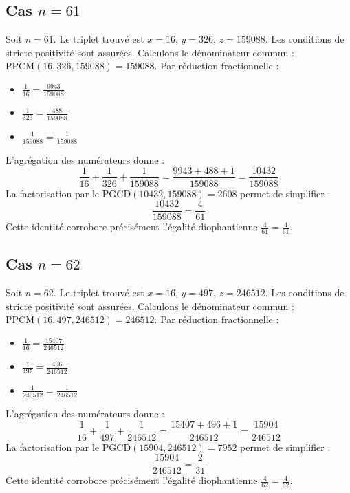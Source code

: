 \documentclass[11pt,a4paper]{article}
\begin{document}
\subsection{Cas $n = 61$}
Soit $n = 61$. Le triplet trouvé est $x = 16$, $y = 326$, $z = 159088$.
Les conditions de stricte positivité sont assurées.
Calculons le dénominateur commun : $\text{PPCM}(16, 326, 159088) = 159088$.
Par réduction fractionnelle :
\begin{itemize}
    \item $\frac{1}{16} = \frac{9943}{159088}$
    \item $\frac{1}{326} = \frac{488}{159088}$
    \item $\frac{1}{159088} = \frac{1}{159088}$
\end{itemize}
L'agrégation des numérateurs donne :
$$ \frac{1}{16} + \frac{1}{326} + \frac{1}{159088} = \frac{9943 + 488 + 1}{159088} = \frac{10432}{159088} $$
La factorisation par le $\text{PGCD}(10432, 159088) = 2608$ permet de simplifier :
$$ \frac{10432}{159088} = \frac{4}{61} $$
Cette identité corrobore précisément l'égalité diophantienne $\frac{4}{61} = \frac{4}{61}$.

\subsection{Cas $n = 62$}
Soit $n = 62$. Le triplet trouvé est $x = 16$, $y = 497$, $z = 246512$.
Les conditions de stricte positivité sont assurées.
Calculons le dénominateur commun : $\text{PPCM}(16, 497, 246512) = 246512$.
Par réduction fractionnelle :
\begin{itemize}
    \item $\frac{1}{16} = \frac{15407}{246512}$
    \item $\frac{1}{497} = \frac{496}{246512}$
    \item $\frac{1}{246512} = \frac{1}{246512}$
\end{itemize}
L'agrégation des numérateurs donne :
$$ \frac{1}{16} + \frac{1}{497} + \frac{1}{246512} = \frac{15407 + 496 + 1}{246512} = \frac{15904}{246512} $$
La factorisation par le $\text{PGCD}(15904, 246512) = 7952$ permet de simplifier :
$$ \frac{15904}{246512} = \frac{2}{31} $$
Cette identité corrobore précisément l'égalité diophantienne $\frac{4}{62} = \frac{4}{62}$.
\end{document}
